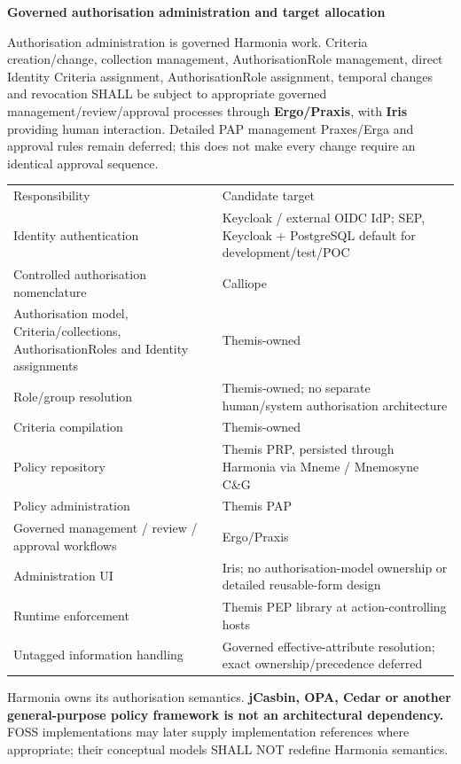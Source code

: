 \par\medskip\textbf{Governed authorisation administration and target allocation}\par


Authorisation administration is governed Harmonia work. Criteria creation/change,
collection management, AuthorisationRole management, direct Identity Criteria
assignment, AuthorisationRole assignment, temporal changes and revocation SHALL
be subject to appropriate governed management/review/approval processes through
\textbf{Ergo/Praxis}, with \textbf{Iris} providing human interaction. Detailed PAP management
Praxes/Erga and approval rules remain deferred; this does not make every change
require an identical approval sequence.



\begin{longtable}{>{\raggedright\arraybackslash}p{}>{\raggedright\arraybackslash}p{}}
Responsibility & Candidate target \\
Identity authentication & Keycloak / external OIDC IdP; SEP, Keycloak + PostgreSQL default for development/test/POC \\
Controlled authorisation nomenclature & Calliope \\
Authorisation model, Criteria/collections, AuthorisationRoles and Identity assignments & Themis-owned \\
Role/group resolution & Themis-owned; no separate human/system authorisation architecture \\
Criteria compilation & Themis-owned \\
Policy repository & Themis PRP, persisted through Harmonia via Mneme / Mnemosyne C\&G \\
Policy administration & Themis PAP \\
Governed management / review / approval workflows & Ergo/Praxis \\
Administration UI & Iris; no authorisation-model ownership or detailed reusable-form design \\
Runtime enforcement & Themis PEP library at action-controlling hosts \\
Untagged information handling & Governed effective-attribute resolution; exact ownership/precedence deferred \\
\end{longtable}


Harmonia owns its authorisation semantics. \textbf{jCasbin, OPA, Cedar or another
general-purpose policy framework is not an architectural dependency.} FOSS
implementations may later supply implementation references where appropriate;
their conceptual models SHALL NOT redefine Harmonia semantics.



